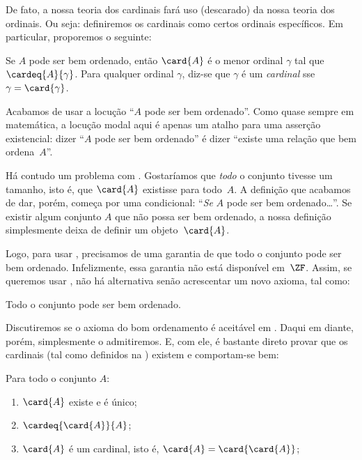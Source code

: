 \documentclass[../../../include/open-logic-section]{subfiles}
\begin{document}

De fato, a nossa teoria dos cardinais fará uso (descarado) da nossa
teoria dos ordinais. Ou seja: definiremos os cardinais como certos
ordinais específicos. Em particular, proporemos o seguinte:

\begin{defn}
Se $A$ pode ser bem ordenado, então $\card{A}$ é o menor ordinal
$\gamma$ tal que $\cardeq{A}{\gamma}$. Para qualquer ordinal $\gamma$,
diz-se que $\gamma$ é um \emph{cardinal} sse $\gamma = \card{\gamma}$.
\end{defn}

Acabamos de usar a locução ``$A$ pode ser bem ordenado''. Como quase
sempre em matemática, a locução modal aqui é apenas um atalho para uma asserção existencial: dizer ``$A$ pode ser
bem ordenado'' é dizer ``existe uma relação que
bem ordena~$A$''.

Há contudo um problema com . Gostaríamos
que \emph{todo} o conjunto tivesse um tamanho, isto é, que
$\card{A}$ existisse para todo~$A$. A definição que acabamos de dar,
porém, começa por uma condicional: ``\emph{Se} $A$ pode ser
bem ordenado\ldots''. Se existir algum conjunto $A$ que não possa ser
bem ordenado, a nossa definição simplesmente deixa de definir um objeto~$\card{A}$.

Logo, para usar , precisamos de uma garantia de que
todo o conjunto pode ser bem ordenado. Infelizmente, essa garantia não está
disponível em~$\ZF$. Assim, se queremos usar
, não há alternativa senão acrescentar um novo
axioma, tal como:
\begin{axiom}
Todo o conjunto pode ser bem ordenado.
\end{axiom}
Discutiremos se o axioma do bom ordenamento é aceitável em
. Daqui em diante, porém, simplesmente o admitiremos. E, com ele, é bastante direto provar
que os cardinais (tal como definidos na ) existem e
comportam-se bem:

\begin{lem}
Para todo o conjunto $A$:
\begin{enumerate}
	\item{} $\card{A}$ existe e é único;
	\item{}  $\cardeq{\card{A}}{A}$;
	\item{}  $\card{A}$ é um cardinal, isto é,
	$\card{A} = \card{\card{A}}$;
\end{enumerate}
\end{lem}
\end{document}
